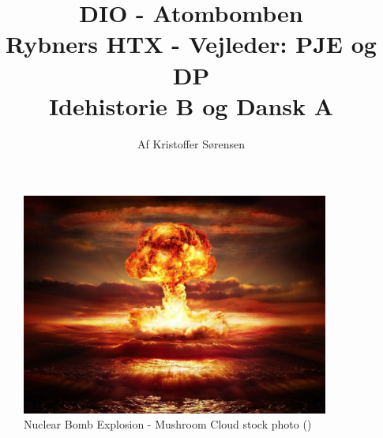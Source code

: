 \title{
    DIO - Atombomben \\ 
    \large{Rybners HTX - Vejleder: PJE og DP} \\
    \small{Idehistorie B og Dansk A}
}
\author{Af Kristoffer Sørensen}
\thispagestyle{empty}
\maketitle
\begin{figure}[h!]
    \centering
    \includegraphics[width=0.9\textwidth]{figurs/forsideimg.jpg}
    \caption{Nuclear Bomb Explosion - Mushroom Cloud stock photo (\cite{RomoloTavani2018}) }%
    \label{fig:Forsideimg}
\end{figure}
\newpage
